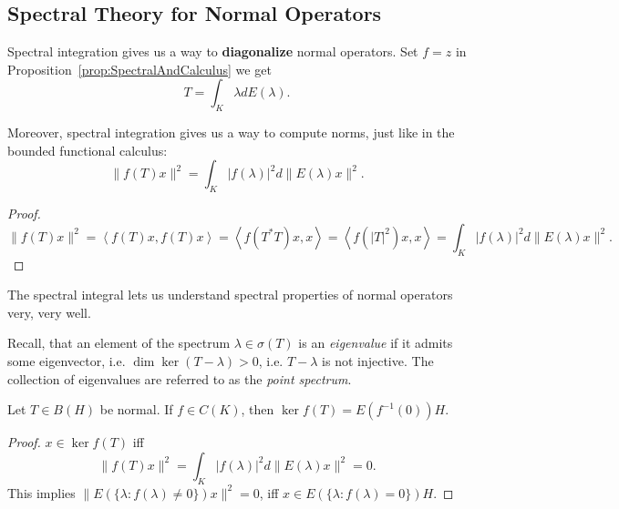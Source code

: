 \subsection{Spectral Theory for Normal Operators}

Spectral integration gives us a way to \textbf{diagonalize} normal operators. Set $f = z$ in  Proposition~\ref{prop:SpectralAndCalculus} we get
\[
	T = \int _K \lambda d E(\lambda)
.\] 

Moreover, spectral integration gives us a way to compute norms, just like in the bounded functional calculus:
\[
	\|f(T)x\|^2 = \int _K |f(\lambda)|^2 d \|E(\lambda)x\|^2
.\] 
\begin{proof}
	\[
		\|f(T) x\|^2
		= \left\langle f(T) x, f(T) x \right\rangle 
		= \left\langle f(T^* T) x, x \right\rangle 
		= \left\langle f(|T|^2)x, x \right\rangle 
		= \int _K |f(\lambda)|^2 d \|E(\lambda) x\|^2
	.\] 
\end{proof}

The spectral integral lets us understand spectral properties of normal operators very, very well.

Recall, that an element of the spectrum $\lambda \in \sigma(T)$ is an \textit{eigenvalue} if it admits some eigenvector, i.e. $\operatorname{dim} \operatorname{ker} (T - \lambda) > 0$, i.e. $T - \lambda$ is not injective. The collection of eigenvalues are referred to as the \textit{point spectrum}.

\begin{lemma}
	\label{lem:KerfT}
	Let $T \in B(H)$ be normal. If $f \in C(K)$, then $\operatorname{ker} f(T) = E\left( f^{-1}(0) \right) H$.
\end{lemma}
\begin{proof}
	$x \in \operatorname{ker} f(T)$ iff
	\[
		\|f(T) x\|^2 = \int _K |f(\lambda)|^2 d \|E(\lambda)x\|^2 = 0
	.\] 
	This implies $\|E\left( \{\lambda: f(\lambda) \neq 0\}  \right) x\|^2 = 0$, iff $x \in E\left( \{\lambda: f(\lambda) = 0\}  \right) H$.
\end{proof}


